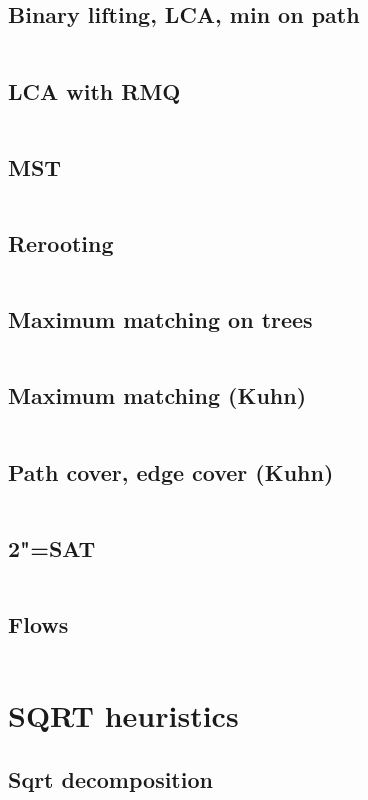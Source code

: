 ﻿\documentclass[10pt,twocolumn,oneside]{article}
\begin{document}
\subsection{Binary lifting, LCA, min on path}
\inputminted[breaklines]{cpp}{Graph algorithms/binary lifting + lca + min on path.cpp}
\subsection{LCA with RMQ}
\inputminted[breaklines]{cpp}{Graph algorithms/lca with rmq.cpp}
\subsection{MST}
\inputminted[breaklines]{cpp}{Graph algorithms/mst.cpp}
\subsection{Rerooting}
\inputminted[breaklines]{cpp}{Graph algorithms/rerooting.cpp}
\subsection{Maximum matching on trees}
\inputminted[breaklines]{cpp}{Graph algorithms/maximum matching on trees.cpp}
\subsection{Maximum matching (Kuhn)}
\inputminted[breaklines]{cpp}{Graph algorithms/kuhn (with optimizations).cpp}
\subsection{Path cover, edge cover (Kuhn)}
\inputminted[breaklines]{cpp}{Graph algorithms/path cover + edge cover (kuhn).cpp}
\subsection{2"=SAT}
\inputminted[breaklines]{cpp}{Graph algorithms/2-sat.cpp}
\subsection{Flows}
\inputminted[breaklines]{python}{Graph algorithms/flows.py}

\section{SQRT heuristics}
\subsection{Sqrt decomposition}
\inputminted[breaklines]{python}{SQRT heuristics/sqrt decomposition.py}
\end{document}
